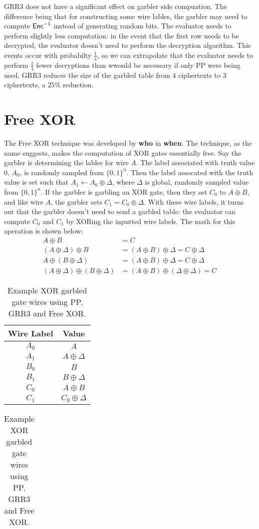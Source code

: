 GRR3 does not have a significant effect on garbler side compuation.
The difference being that for constructing some wire lables, the garbler may need to compute $\textsf{Enc}^{-1}$ instead of generating random bits. 
The evaluator needs to perform slightly less computation: in the event that the first row needs to be decrypted, the evaluator doesn't need to perform the decryption algorithm. 
This events occur with probabilty $\frac{1}{4}$, so we can extrapolate that the evaluator needs to perform $\frac{1}{4}$ fewer decryptions than wwould be necessary if only PP were being used.
GRR3 reduces the size of the garbled table from $4$ ciphertexts to $3$ ciphertexts, a $25\%$ reduction.

\section{Free XOR}
The Free XOR technique was developed by \textbf{who} in \textbf{when}.
The technique, as the name suggests, makes the computation of XOR gates essentially free.
Say the garbler is determining the lables for wire $A$.
The label associated with truth value $0$, $A_0$, is randomly sampled from $\{0,1\}^n$. 
Then the label assocated with the truth value is set such that $A_1 \gets A_0 \oplus \Delta$, where $\Delta$ is global, randomly sampled value from $\{0,1\}^n$.
If the garbler is garbling an XOR gate, then they set $C_0$ to $A \oplus B$, and like wire $A$, the garbler sets $C_1 = C_0 \oplus \Delta$.
With these wire labels, it turns out that the garbler doesn't need to send a garbled table: the evaluator can compute $C_0$ and $C_1$ by XORing the inputted wire labels.
The math for this operation is shown below:
\begin{align*}
    A \oplus B & = C \\
    (A \oplus \Delta) \oplus B & = (A \oplus B) \oplus \Delta = C \oplus \Delta \\
    A \oplus (B \oplus \Delta) & = (A \oplus B) \oplus \Delta = C \oplus \Delta \\
    (A \oplus \Delta) \oplus (B \oplus \Delta) & = (A \oplus B) \oplus (\Delta \oplus  \Delta) = C 
\end{align*}

\begin{table}[h]
    \centering
    \begin{tabular}{|c|c|}
        \hline
        Wire Label & Value\\
        \hline
        $A_0$ & $A$ \\
        $A_1$ & $A \oplus \Delta$ \\
        $B_0$ & $B$ \\
        $B_1$ & $B \oplus \Delta$ \\
        $C_0$ & $A \oplus B$ \\
        $C_1$ & $C_0 \oplus \Delta$ \\
        \hline
    \end{tabular}
    \qquad
    \begin{tabular}{|c|}
        \hline
        \hline
    \end{tabular}
    \caption{Example XOR garbled gate wires using PP, GRR3 and Free XOR.}
\end{table}

